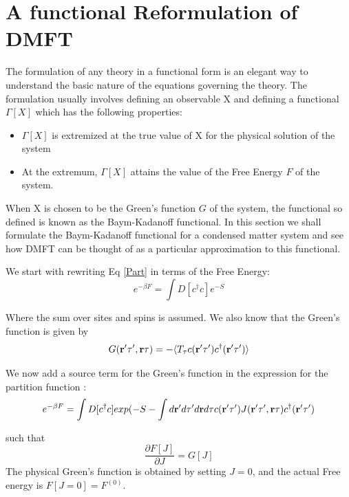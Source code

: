 \documentclass[10pt]{ruthesis}
\begin{document}
\section{A functional Reformulation of DMFT}

The formulation of any theory in a functional form is an elegant way to understand the basic nature of the equations governing the theory. The formulation usually involves defining an observable X and defining a functional $\Gamma[X]$ which has the following properties:
\begin{itemize}
\item $\Gamma[X]$ is extremized at the true value of X for the physical solution of the system
\item At the extremum, $\Gamma[X]$ attains the value of the Free Energy $F$ of the system.
\end{itemize}
 When X is chosen to be the Green's function $G$ of the system, the functional so defined is known as the Baym-Kadanoff functional. In this section we shall formulate the Baym-Kadanoff functional for a condensed matter system and see how DMFT can be thought of as a particular approximation to this functional.
 
We start with rewriting Eq \ref{Part} in terms of the Free Energy:
\begin{equation}
 e^{-\beta F}=\int  D [c^\dagger c] e^{-S}
\end{equation}

Where the sum over sites and spins is assumed. We also know that the Green's function is given by 
\begin{equation}
G(\mathbf{r}' \tau', \mathbf{r} \tau) = -\langle T_{\tau} c(\mathbf{r}' \tau') c ^\dagger (\mathbf{r}' \tau') \rangle 
\end{equation}

We now add a source term for the Green's function in the expression for the partition function :
\begin{equation}
 e^{-\beta F}=\int  D [c^\dagger c] exp(-S -\int d\mathbf{r}' d\tau' d\mathbf{r} d\tau c(\mathbf{r}' \tau') J(\mathbf{r}' \tau', \mathbf{r} \tau)c ^\dagger (\mathbf{r}' \tau') 
 \end{equation}

such that 
\begin{equation}
\dfrac{\partial F[J]}{\partial J}= G[J]
\end{equation}
The physical Green's function is obtained by setting $ J=0$, and the actual Free energy is $F[J=0]=F^{(0)}$. 
\end{document}
